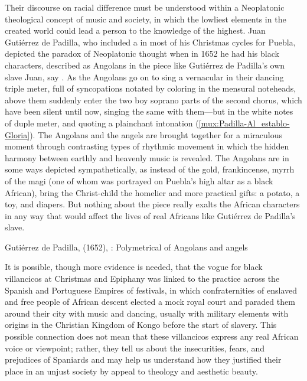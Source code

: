 Their discourse on racial difference must be understood within a Neoplatonic
theological concept of music and society, in which the lowliest elements in the
created world could lead a person to the knowledge of the highest.
Juan Gutiérrez de Padilla, who included a  in most of
his Christmas cycles for Puebla, depicted the paradox of Neoplatonic thought
when in 1652 he had his black characters, described as Angolans in the piece
like Gutiérrez de Padilla's own slave Juan, say .
As the Angolans go on to sing a vernacular  in their
dancing triple meter, full of syncopations notated by coloring in the mensural
noteheads, above them suddenly enter the two boy soprano parts of the second
chorus, which have been silent until now, singing the same  with
them---but in the white notes of duple meter, and quoting a plainchant
intonation (\cref{mux:Padilla-Al_establo-Gloria}).
The Angolans and the angels are brought together for a miraculous moment
through contrasting types of rhythmic movement in which the hidden harmony
between earthly and heavenly music is revealed.
The Angolans are in some ways depicted sympathetically, as instead
of the gold, frankincense, myrrh of the magi (one of whom was portrayed on
Puebla's high altar as a black African), bring the Christ-child the homelier
and more practical gifts: a potato, a toy, and diapers.
But nothing about the piece really exalts the African characters in any way
that would affect the lives of real Africans like Gutiérrez de Padilla's slave.

{Gutiérrez de Padilla,  (1652), :
Polymetrical  of Angolans and angels}

It is possible, though more evidence is needed, that the vogue for black
villancicos at Christmas and Epiphany was linked to the practice across the
Spanish and Portuguese Empires of  festivals, in which
confraternities of enslaved and free people of African descent elected a mock
royal court and paraded them around their city with music and dancing, usually
with military elements with origins in the Christian Kingdom of Kongo before
the start of slavery.%
    \Autocites
    {Fromont:DancingKingCongo}
    {Fromont:DanceImageMyth}
    {Fromont:Kongo}
This possible connection does not mean that these villancicos express any real
African voice or viewpoint; rather, they tell us about the insecurities, fears,
and prejudices of Spaniards and may help us understand how they justified their
place in an unjust society by appeal to theology and aesthetic beauty.

